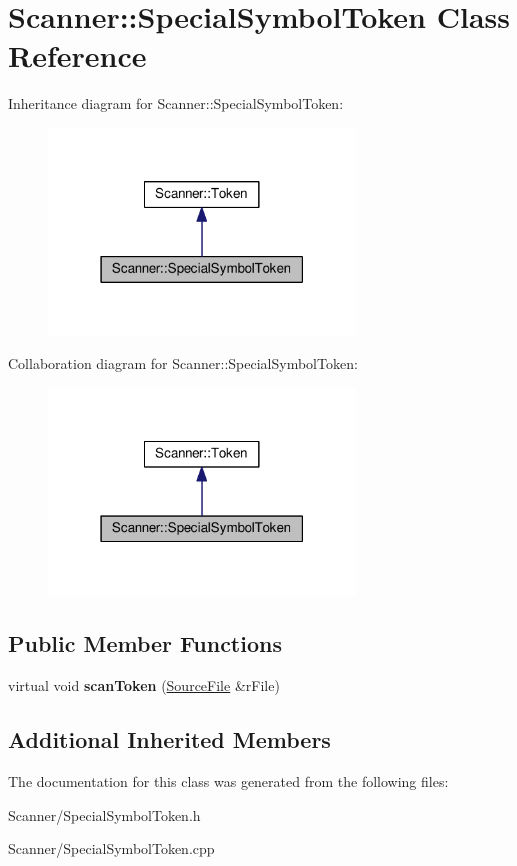 \hypertarget{class_scanner_1_1_special_symbol_token}{}\section{Scanner\+:\+:Special\+Symbol\+Token Class Reference}
\label{class_scanner_1_1_special_symbol_token}


Inheritance diagram for Scanner\+:\+:Special\+Symbol\+Token\+:
\nopagebreak
\begin{figure}[H]
\begin{center}
\leavevmode
\includegraphics[width=231pt]{class_scanner_1_1_special_symbol_token__inherit__graph}
\end{center}
\end{figure}


Collaboration diagram for Scanner\+:\+:Special\+Symbol\+Token\+:
\nopagebreak
\begin{figure}[H]
\begin{center}
\leavevmode
\includegraphics[width=231pt]{class_scanner_1_1_special_symbol_token__coll__graph}
\end{center}
\end{figure}
\subsection*{Public Member Functions}
\begin{DoxyCompactItemize}
\item 
virtual void {\bfseries scan\+Token} (\hyperlink{class_scanner_1_1_source_file}{Source\+File} \&r\+File)\hypertarget{class_scanner_1_1_special_symbol_token_a6f4ce9fb7bdb49c11400f41a9aef1030}{}\label{class_scanner_1_1_special_symbol_token_a6f4ce9fb7bdb49c11400f41a9aef1030}

\end{DoxyCompactItemize}
\subsection*{Additional Inherited Members}


The documentation for this class was generated from the following files\+:\begin{DoxyCompactItemize}
\item 
Scanner/Special\+Symbol\+Token.\+h\item 
Scanner/Special\+Symbol\+Token.\+cpp\end{DoxyCompactItemize}
